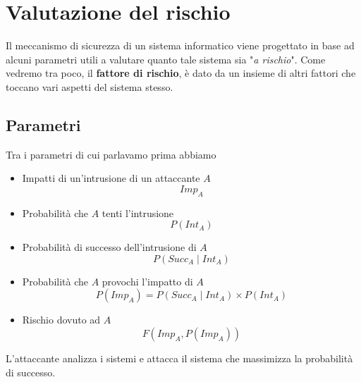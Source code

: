 \chapter{Valutazione del rischio}
Il meccanismo di sicurezza di un sistema informatico viene progettato in base ad alcuni parametri utili a valutare
quanto tale sistema sia "\emph{a rischio}". Come vedremo tra poco, il \textbf{fattore di rischio}, è dato da un 
insieme di altri fattori che toccano vari aspetti del sistema stesso.

\section{Parametri}
Tra i parametri di cui parlavamo prima abbiamo
\begin{itemize}
	\item Impatti di un'intrusione di un attaccante $A$ \[ Imp_A \]
	\item Probabilità che $A$ tenti l'intrusione \[ P(Int_A) \]
	\item Probabilità di successo dell'intrusione di $A$ \[ P(Succ_A \mid Int_A) \]
	\item Probabilità che $A$ provochi l'impatto di $A$ \[ P(Imp_A) = P(Succ_A \mid Int_A) \times P(Int_A) \]
	\item Rischio dovuto ad $A$ \[ F(Imp_A, P(Imp_A)) \]
\end{itemize}
L'attaccante analizza i sistemi e attacca il sistema che massimizza la probabilità di successo.